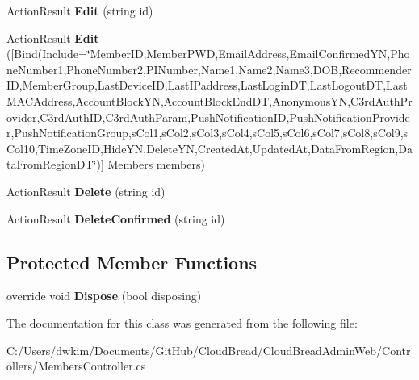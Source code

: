 \begin{DoxyCompactItemize}
\item 
Action\+Result {\bfseries Edit} (string id)\hypertarget{a00146_a8db961e69156f60f3be73521f9db2a92}{}\label{a00146_a8db961e69156f60f3be73521f9db2a92}

\item 
Action\+Result {\bfseries Edit} (\mbox{[}Bind(Include=\char`\"{}Member\+ID,Member\+P\+WD,Email\+Address,Email\+Confirmed\+YN,Phone\+Number1,Phone\+Number2,P\+I\+Number,Name1,Name2,Name3,D\+OB,Recommender\+ID,Member\+Group,Last\+Device\+ID,Last\+I\+Paddress,Last\+Login\+DT,Last\+Logout\+DT,Last\+M\+A\+C\+Address,Account\+Block\+YN,Account\+Block\+End\+DT,Anonymous\+YN,C3rd\+Auth\+Provider,C3rd\+Auth\+ID,C3rd\+Auth\+Param,Push\+Notification\+ID,Push\+Notification\+Provider,Push\+Notification\+Group,s\+Col1,s\+Col2,s\+Col3,s\+Col4,s\+Col5,s\+Col6,s\+Col7,s\+Col8,s\+Col9,s\+Col10,Time\+Zone\+ID,Hide\+YN,Delete\+YN,Created\+At,Updated\+At,Data\+From\+Region,Data\+From\+Region\+DT\char`\"{})\mbox{]} Members members)\hypertarget{a00146_a806d803f2234b493bc5c6f4bfe64e57f}{}\label{a00146_a806d803f2234b493bc5c6f4bfe64e57f}

\item 
Action\+Result {\bfseries Delete} (string id)\hypertarget{a00146_a7cf4b841a01950d27b69785f2255c854}{}\label{a00146_a7cf4b841a01950d27b69785f2255c854}

\item 
Action\+Result {\bfseries Delete\+Confirmed} (string id)\hypertarget{a00146_a4fda262d2c527a8326a19f751923f518}{}\label{a00146_a4fda262d2c527a8326a19f751923f518}

\end{DoxyCompactItemize}
\subsection*{Protected Member Functions}
\begin{DoxyCompactItemize}
\item 
override void {\bfseries Dispose} (bool disposing)\hypertarget{a00146_a9de35eb494bdafa2e96302ec38fb4a6d}{}\label{a00146_a9de35eb494bdafa2e96302ec38fb4a6d}

\end{DoxyCompactItemize}


The documentation for this class was generated from the following file\+:\begin{DoxyCompactItemize}
\item 
C\+:/\+Users/dwkim/\+Documents/\+Git\+Hub/\+Cloud\+Bread/\+Cloud\+Bread\+Admin\+Web/\+Controllers/Members\+Controller.\+cs\end{DoxyCompactItemize}
